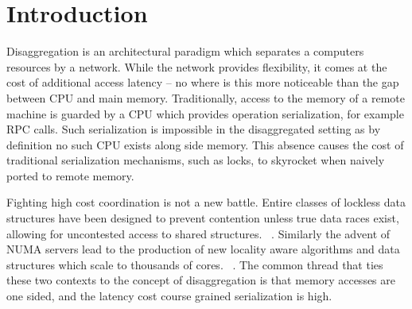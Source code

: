 

%




\section{Introduction}

Disaggregation is an architectural paradigm which separates a computers
resources by a network. While the network provides flexibility, it comes at the
cost of additional access latency
-- no where is this more noticeable than the gap between CPU and main memory.
Traditionally, access to the memory of a remote machine is guarded by a CPU
which provides operation serialization, for example RPC calls.  Such
serialization is impossible in the disaggregated setting as by definition no
such CPU exists along side memory. This absence causes the cost of traditional
serialization mechanisms, such as locks, to skyrocket when naively ported to
remote memory.

Fighting high cost coordination is not a new battle. Entire classes of lockless
data structures have been designed to prevent contention unless true data races
exist, allowing for uncontested access to shared structures.
~\cite{simple-fast,lock-free-skip,non-block-binary,read-concur-btree,lock-free-btree}.
Similarly the advent of NUMA servers lead to the production of new locality
aware algorithms and data structures which scale to thousands of cores.
~\cite{linux-scale,black-box-numa}. The common thread
that ties these two contexts to the concept of disaggregation is that memory
accesses are one sided, and the latency cost course grained serialization is
high.

